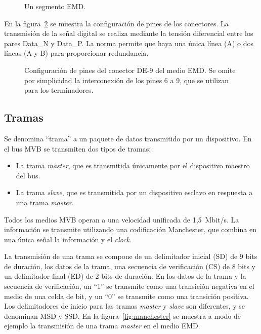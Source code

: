 \begin{figure}[htbp]
	\centering
    {
        \fontsize{9pt}{9pt}\selectfont
        
    }
	\caption[Un segmento EMD]{Un segmento EMD.}
    \label{fig:segmento}
\end{figure}

En la figura~\ref{fig:pines} se muestra la configuración de pines de los conectores.
La transmisión de la señal digital se realiza mediante la tensión diferencial entre los pares Data\_N y Data\_P. La norma permite que haya una única línea (A) o dos líneas (A y B) para proporcionar redundancia.

\begin{figure}[htbp]
	\centering
    {
        \fontsize{8pt}{8pt}\selectfont
        
    }
	\caption[Configuración de pines del conector D-sub de 9 pines del medio EMD]{Configuración de pines del conector DE-9 del medio EMD. Se omite por simplicidad la interconexión de los pines 6 a 9, que se utilizan para los terminadores.}
    \label{fig:pines}
\end{figure}

\subsection{Tramas}

Se denomina ``trama'' a un paquete de datos transmitido por un dispositivo.
En el bus MVB se transmiten dos tipos de tramas:

\begin{itemize}
\item La trama \textit{master}, que es transmitida únicamente por el dispositivo maestro del bus.
\item La trama \textit{slave}, que es transmitida por un dispositivo esclavo en respuesta a una trama \textit{master}.
\end{itemize}

Todos los medios MVB operan a una velocidad unificada de 1,5~Mbit/s.
La información se transmite utilizando una codificación Manchester, que combina en una única señal la información y el \textit{clock}.

La transmisión de una trama se compone de un delimitador inicial (SD) de 9 bits de duración, los datos de la trama, una secuencia de verificación (CS) de 8 bits y un delimitador final (ED) de 2 bits de duración.
En los datos de la trama y la secuencia de verificación, un ``1'' se transmite como una transición negativa en el medio de una celda de bit, y un ``0'' se transmite como una transición positiva.
Los delimitadores de inicio para las tramas \textit{master} y \textit{slave} son diferentes, y se denominan MSD y SSD.
En la figura~\ref{fig:manchester} se muestra a modo de ejemplo la transmisión de una trama \textit{master} en el medio EMD.

